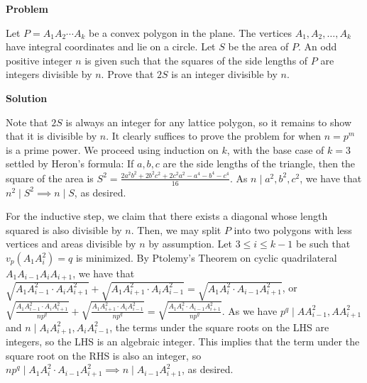 \begin{problem}
[IMO2016PL3]

\textbf{Problem}


Let $P = A_1A_2 \cdots A_k$ be a convex polygon in the plane. The vertices $A_1,A_2,\dots, A_k$ have integral coordinates and lie on a circle. Let $S$ be the area of $P$. An odd positive integer $n$ is given such that the squares of the side lengths of $P$ are integers divisible by $n$. Prove that $2S$ is an integer divisible by $n$.

\textbf{Solution}



Note that $2S$ is always an integer for any lattice polygon, so it remains to show that it is divisible by $n$. It clearly suffices to prove the problem for when $n=p^m$ is a prime power. We proceed using induction on $k$, with the base case of $k=3$ settled by Heron's formula: If $a,b,c$ are the side lengths of the triangle, then the square of the area is $S^2=\frac{2a^2b^2+2b^2c^2+2c^2a^2-a^4-b^4-c^4}{16}$. As $n\mid a^2,b^2,c^2$, we have that $n^2\mid S^2\implies n\mid S$, as desired.

For the inductive step, we claim that there exists a diagonal whose length squared is also divisible by $n$. Then, we may split $P$ into two polygons with less vertices and areas divisible by $n$ by assumption. Let $3\le i\le k-1$ be such that $v_p(A_1A_i^2)=q$ is minimized. By Ptolemy's Theorem on cyclic quadrilateral $A_1A_{i-1}A_iA_{i+1}$, we have that $\sqrt{A_1A_{i-1}^2\cdot A_iA_{i+1}^2}+\sqrt{A_1A_{i+1}^2\cdot A_iA_{i-1}^2}=\sqrt{A_1A_i^2\cdot A_{i-1}A_{i+1}^2}$, or $\sqrt{\frac{A_1A_{i-1}^2\cdot A_iA_{i+1}^2}{np^q}}+\sqrt{\frac{A_1A_{i+1}^2\cdot A_iA_{i-1}^2}{np^q}}=\sqrt{\frac{A_1A_i^2\cdot A_{i-1}A_{i+1}^2}{np^q}}$. As we have $p^q\mid AA_{i-1}^2,AA_{i+1}^2$ and $n\mid A_iA_{i+1}^2,A_iA_{i-1}^2$, the terms under the square roots on the LHS are integers, so the LHS is an algebraic integer. This implies that the term under the square root on the RHS is also an integer, so $np^q\mid A_1A_i^2\cdot A_{i-1}A_{i+1}^2\implies n\mid A_{i-1}A_{i+1}^2$, as desired.
\end{problem}

